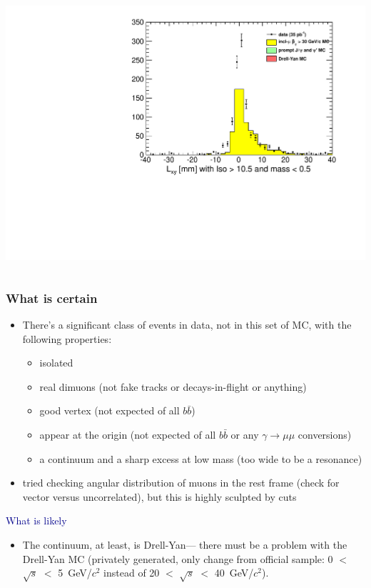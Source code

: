 \documentclass[compress]{beamer}
\begin{document}
\begin{frame}
\begin{columns}
\includegraphics[width=\linewidth]{lowdimuon_lxy_lowmass_noniso.pdf}
\end{columns}
\end{frame}

\begin{frame}
\frametitle{What is certain}

\begin{itemize}
\item There's a significant class of events in data, not in this set
  of MC, with the following properties:
\begin{itemize}
\item isolated
\item real dimuons (not fake tracks or decays-in-flight or anything)
\item good vertex (not expected of all $b\bar{b}$)
\item appear at the origin (not expected of all $b\bar{b}$ or any $\gamma \to \mu\mu$ conversions)
\item a continuum and a sharp excess at low mass (too wide to be a resonance)
\end{itemize}

\item tried checking angular distribution of muons in the rest frame
  (check for vector versus uncorrelated), but this is highly sculpted
  by cuts
\end{itemize}

\vspace{0.3 cm}
\hspace{-0.83 cm} \textcolor{darkblue}{\Large What is likely}

\vspace{0.1 cm}
\begin{itemize}
\item The continuum, at least, is Drell-Yan--- there must be a problem
  with the Drell-Yan MC (privately generated, only change from
  official sample: 0 $<$ $\sqrt{s}$ $<$ 5~GeV/$c^2$ instead of 20 $<$
  $\sqrt{s}$ $<$ 40~GeV/$c^2$).
\end{itemize}
\end{frame}
\end{document}
